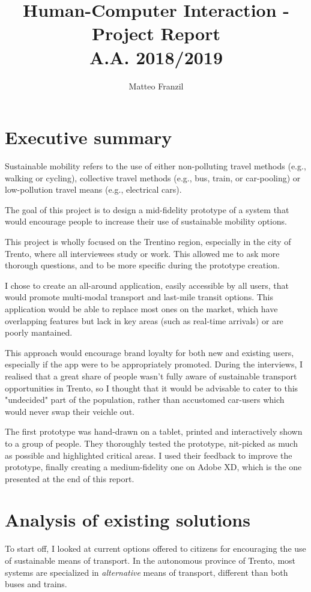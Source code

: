 \documentclass[11pt]{article}
\title{Human-Computer Interaction - Project Report\\A.A. 2018/2019}
\author{Matteo Franzil}
\begin{document}
\maketitle

\section{Executive summary}

Sustainable mobility refers to the use of either non-polluting travel methods (e.g., walking or cycling), collective travel methods (e.g., bus, train, or car-pooling) or low-pollution travel means (e.g., electrical cars).

The goal of this project is to design a mid-fidelity prototype of a system that would encourage people to increase their use of sustainable mobility options.

This project is wholly focused on the Trentino region, especially in the city of Trento, where all interviewees study or work. This allowed me to ask more thorough questions, and to be more specific during the prototype creation.

I chose to create an all-around application, easily accessible by all users, that would promote multi-modal transport and last-mile transit options. This application would be able to replace most ones on the market, which have overlapping features but lack in key areas (such as real-time arrivals) or are poorly mantained.

This approach would encourage brand loyalty for both new and existing users, especially if the app were to be appropriately promoted. During the interviews, I realised that a great share of people wasn't fully aware of sustainable transport opportunities in Trento, so I thought that it would be advisable to cater to this "undecided" part of the population, rather than accustomed car-users which would never swap their veichle out.

The first prototype was hand-drawn on a tablet, printed and interactively shown to a group of people. They thoroughly tested the prototype, nit-picked as much as possible and highlighted critical areas. I used their feedback to improve the prototype, finally creating a medium-fidelity one on Adobe XD, which is the one presented at the end of this report.

\section{Analysis of existing solutions}
To start off, I looked at current options offered to citizens for encouraging the use of sustainable means of transport. In the autonomous province of Trento, most systems are specialized in \textit{alternative} means of transport, different than both buses and trains.
\end{document}
